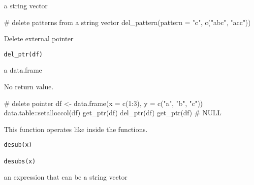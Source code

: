 \documentclass[letterpaper]{book}
\begin{document}
%
\begin{Value}
a string vector
\end{Value}
%
\begin{Examples}
\begin{ExampleCode}
# delete patterns from a string vector
del_pattern(pattern = "c", c("abc", "acc"))

\end{ExampleCode}
\end{Examples}
%
\begin{Description}
Delete external pointer
\end{Description}
%
\begin{Usage}
\begin{verbatim}
del_ptr(df)
\end{verbatim}
\end{Usage}
%
\begin{Arguments}
\begin{ldescription}
\item[\code{df}] a data.frame
\end{ldescription}
\end{Arguments}
%
\begin{Value}
No return value.
\end{Value}
%
\begin{Examples}
\begin{ExampleCode}
# delete pointer
df <- data.frame(x = c(1:3), y = c("a", "b", "c"))
data.table::setalloccol(df)
get_ptr(df)
del_ptr(df)
get_ptr(df) # NULL

\end{ExampleCode}
\end{Examples}
%
\begin{Description}
This function operates like  inside the functions.
\end{Description}
%
\begin{Usage}
\begin{verbatim}
desub(x)

desubs(x)
\end{verbatim}
\end{Usage}
%
\begin{Arguments}
\begin{ldescription}
\item[\code{x}] an expression that can be a string vector
\end{ldescription}
\end{Arguments}
\end{document}
